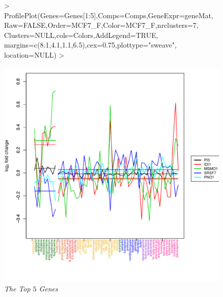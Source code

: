 \documentclass[a4paper]{article}
\begin{document}
\begin{figure}[H] 
\centering
\begin{Schunk}
\begin{Sinput}
> ProfilePlot(Genes=Genes[1:5],Comps=Comps,GeneExpr=geneMat,
             Raw=FALSE,Order=MCF7_F,Color=MCF7_F,nrclusters=7,
             Clusters=NULL,cols=Colors,AddLegend=TRUE,
             margins=c(8.1,4.1,1.1,6.5),cex=0.75,plottype="sweave",
             location=NULL)
> 
\end{Sinput}
\end{Schunk}
\includegraphics{IntClustVignette-ProfilePlot}
\vspace{-1.0cm}
\caption{{\it The Top $5$ Genes}\label{MCF7_Weights}}
\end{figure}
\newpage
\end{document}
